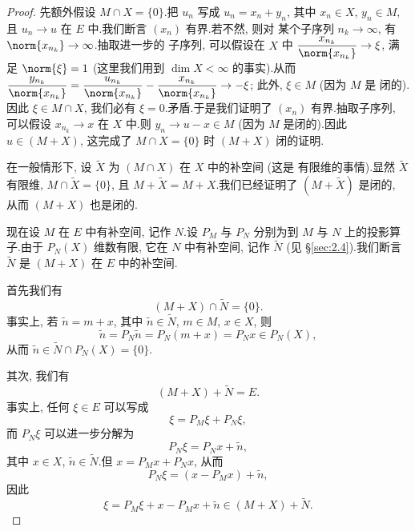 \begin{proof}
先额外假设 $M\cap X=\{0\}$.把 $u_n$ 写成 $u_n=x_n+y_n$, 其中 $x_n\in X$,
$y_n\in M$, 且 $u_n\to u$ 在 $E$ 中.我们断言 $(x_n)$ 有界.若不然, 则对
某个子序列 $n_k\to\infty$, 有 $\norm{x_{n_k}}\to\infty$.抽取进一步的
子序列, 可以假设在 $X$ 中 $\dfrac{x_{n_k}}{\norm{x_{n_k}}}\to\xi$, 满足
$\norm{\xi}=1$ (这里我们用到 $\dim X<\infty$ 的事实).从而
$\dfrac{y_{n_k}}{\norm{x_{n_k}}}=\dfrac{u_{n_k}}{\norm{x_{n_k}}}
-\dfrac{x_{n_k}}{\norm{x_{n_k}}}\to-\xi$; 此外, $\xi\in M$ (因为 $M$ 是
闭的).因此 $\xi\in M\cap X$, 我们必有 $\xi=0$.矛盾.于是我们证明了
$(x_n)$ 有界.抽取子序列, 可以假设 $x_{n_k}\to x$ 在 $X$ 中.则
$y_n\to u-x\in M$ (因为 $M$ 是闭的).因此 $u\in(M+X)$, 这完成了
$M\cap X=\{0\}$ 时 $(M+X)$ 闭的证明.

在一般情形下, 设 $\widetilde X$ 为 $(M\cap X)$ 在 $X$ 中的补空间 (这是
有限维的事情).显然 $\widetilde X$ 有限维, $M\cap\widetilde X=\{0\}$, 且
$M+\widetilde X=M+X$.我们已经证明了 $(M+\widetilde X)$ 是闭的, 从而
$(M+X)$ 也是闭的.

现在设 $M$ 在 $E$ 中有补空间, 记作 $N$.设 $P_M$ 与 $P_N$ 分别为到 $M$
与 $N$ 上的投影算子.由于 $P_N(X)$ 维数有限, 它在 $N$ 中有补空间, 记作
$\widetilde N$ (见 \S \ref{sec:2.4}).我们断言 $\widetilde N$ 是 $(M+X)$
在 $E$ 中的补空间.

首先我们有
\begin{equation*}
(M+X)\cap\widetilde N=\{0\}.
\end{equation*}
事实上, 若 $\tilde n=m+x$, 其中 $\tilde n\in\widetilde N$, $m\in M$,
$x\in X$, 则
\begin{equation*}
\tilde n=P_N\tilde n=P_N(m+x)=P_Nx\in P_N(X),
\end{equation*}
从而 $\tilde n\in\widetilde N\cap P_N(X)=\{0\}$.

其次, 我们有
\begin{equation*}
(M+X)+\widetilde N=E.
\end{equation*}
事实上, 任何 $\xi\in E$ 可以写成
\begin{equation*}
\xi=P_M\xi+P_N\xi,
\end{equation*}
而 $P_N\xi$ 可以进一步分解为
\begin{equation*}
P_N\xi=P_Nx+\tilde n,
\end{equation*}
其中 $x\in X$, $\tilde n\in\widetilde N$.但 $x=P_Mx+P_Nx$, 从而
\begin{equation*}
P_N\xi=(x-P_Mx)+\tilde n,
\end{equation*}
因此
\begin{equation*}
\xi=P_M\xi+x-P_Mx+\tilde n\in(M+X)+\widetilde N.
\end{equation*}


\end{proof}
